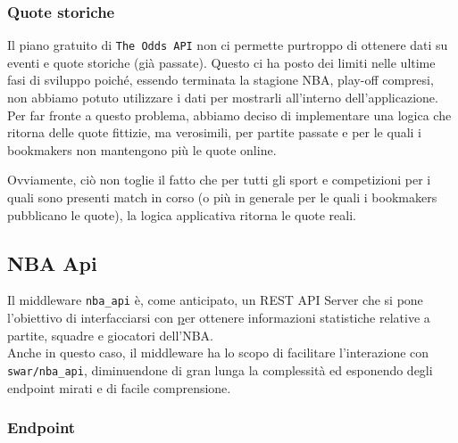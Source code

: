 \subsubsection{Quote storiche}
Il piano gratuito di \texttt{The Odds API} non ci permette purtroppo di ottenere dati su eventi e quote storiche (già passate). Questo ci ha posto dei limiti nelle ultime fasi di sviluppo poiché, essendo terminata la stagione NBA, play-off compresi, non abbiamo potuto utilizzare i dati per mostrarli all'interno dell'applicazione.\\
Per far fronte a questo problema, abbiamo deciso di implementare una logica che ritorna delle quote fittizie, ma verosimili, per partite passate e per le quali i bookmakers non mantengono più le quote online. 

Ovviamente, ciò non toglie il fatto che per tutti gli sport e competizioni per i quali sono presenti match in corso (o più in generale per le quali i bookmakers pubblicano le quote), la logica applicativa ritorna le quote reali.



\subsection{NBA Api}

Il middleware \texttt{nba\_api} è, come anticipato, un REST API Server che si pone l'obiettivo di interfacciarsi con \href{https://github.com/swar/nba_api} per ottenere informazioni statistiche relative a partite, squadre e giocatori dell'NBA.\\
Anche in questo caso, il middleware ha lo scopo di facilitare l'interazione con \texttt{swar/nba\_api}, diminuendone di gran lunga la complessità ed esponendo degli endpoint mirati e di facile comprensione.

\subsubsection{Endpoint}

